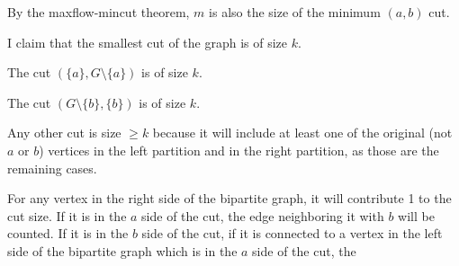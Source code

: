 \documentclass{article}
\begin{document}
By the maxflow-mincut theorem, $m$ is also the size of the minimum $(a,b)$ cut.

I claim that the smallest cut of the graph is of size $k$.

The cut $(\{a\}, G\setminus \{a\})$ is of size $k$.

The cut $(G\setminus \{b\}, \{b\})$ is of size $k$.

Any other cut is size $\geq k$ because it will include at least one of the original
(not $a$ or $b$) vertices in the left partition and in the right partition, as
those are the remaining cases.

For any vertex in the right side of the bipartite graph, it will contribute 1 to the
cut size. If it is in the $a$ side of the cut, the edge neighboring it with
$b$ will be counted. If it is in the $b$ side of the cut, if it is connected
to a vertex in the left side of the bipartite graph which is in the $a$ side
of the cut, the
\end{document}
